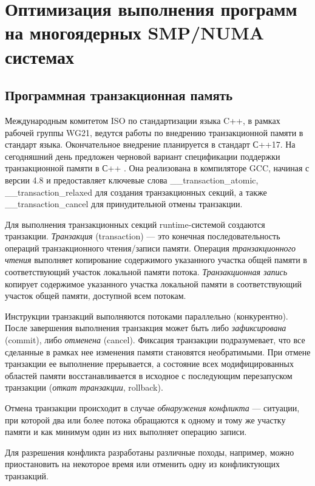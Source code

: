 \chapter{Оптимизация выполнения программ на многоядерных SMP/NUMA системах} 
\label{SMP|NUMA_STM}
\section{Программная транзакционная память}
Международным комитетом ISO по стандартизации языка C++, в рамках рабочей группы 
WG21, ведутся работы по внедрению транзакционной памяти в стандарт языка. 
Окончательное внедрение планируется в стандарт С++17. На сегодняшний день 
предложен черновой вариант спецификации поддержки транзакционной памяти в С++ 
\cite{luchango_maurer_moir}. Она реализована в компиляторе GCC, начиная с версии 
4.8 и предоставляет ключевые слова \_\_transaction\_atomic, 
\_\_transaction\_relaxed для создания транзакционных секций, а также 
\_\_transaction\_cancel для принудительной отмены транзакции. 

Для выполнения транзакционных секций runtime-системой создаются транзакции. 
\textit{Транзакция} (transaction) --- это конечная последовательность операций 
транзакционного чтения/записи памяти. Операция \textit{транзакционного чтения} 
выполняет копирование содержимого указанного участка общей памяти в 
соответствующий участок локальной памяти потока. \textit{Транзакционная запись} 
копирует содержимое указанного участка локальной памяти в соответствующий 
участок общей памяти, доступной всем потокам.

Инструкции транзакций выполняются потоками параллельно (конкурентно). После 
завершения выполнения транзакция может быть либо \textit{зафиксирована} 
(commit), либо \textit{отменена} (cancel). Фиксация транзакции подразумевает, 
что все сделанные в рамках нее изменения памяти становятся необратимыми. При 
отмене транзакции ее выполнение прерывается, а состояние всех модифицированных 
областей памяти восстанавливается в исходное с последующим перезапуском 
транзакции (\textit{откат транзакции}, rollback).

Отмена транзакции происходит в случае \textit{обнаружения конфликта} --- 
ситуации, при которой два или более потока обращаются к одному и тому же участку 
памяти и как минимум один из них выполняет операцию записи.

Для разрешения конфликта разработаны различные походы, например, можно 
приостановить на некоторое время или отменить одну из конфликтующих транзакций.

